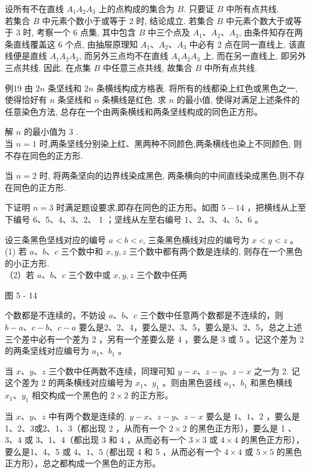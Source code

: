 \documentclass[10pt]{article}
\begin{document}
设所有不在直线 $A_{1} A_{2} A_{3}$ 上的点构成的集合为 $B$. 只要证 $B$ 中所有点共线.\\
若集合 $B$ 中元素个数小于或等于 2 时, 结论成立. 若集合 $B$ 中元素个数大于或等于 3 时, 考察一个 6 点集, 其中包含 $B$ 中三个点及 $A_{1} 、 A_{2} 、 A_{3}$, 由条件知存在两条直线覆盖这 6 个点, 由抽屉原理知 $A_{1} 、 A_{2} 、 A_{3}$ 中必有 2 点在同一直线上, 该直线便是直线 $A_{1} A_{2} A_{3}$, 而另外三点均不在直线 $A_{1} A_{2} A_{3}$ 上, 而在另一直线上, 即另外三点共线. 因此, 在点集 $B$ 中任意三点共线, 故集合 $B$ 中所有点共线.

例19 由 $2 n$ 条坚线和 $2 n$ 条横线构成方格表. 将所有的线都染上红色或黑色之一, 使得恰好有 $n$ 条坚线和 $n$ 条横线是红色. 求 $n$ 的最小值, 使得对满足上述条件的任意染色方法, 总存在一个由两条横线和两条坚线构成的同色正方形。

解 $n$ 的最小值为 3 .\\
当 $n=1$ 时,两条坚线分别染上红、黑两种不同颜色,两条横线也染上不同颜色, 则不存在同色的正方形.

当 $n=2$ 时, 将两条坚向的边界线染成黑色, 两条横向的中间直线染成黑色,则不存在同色的正方形.

下证明 $n=3$ 时满足题设要求,即存在同色的正方形。如图 $5-14$ ，把横线从上至下编号 6、5、4、3、2、 1 ；坚线从左至右编号 $1 、 2 、 3 、 4 、 5 、 6$ 。

设三条黑色坚线对应的编号 $a<b<c$, 三条黑色横线对应的编号为 $x<y<z$ 。\\
(1) 若 $a 、 b 、 c$ 三个数中和 $x, y, z$ 三个数中都有两个数是连续的, 则存在一个黑色的小正方形.\\
（2）若 $a 、 b 、 c$ 三个数中或 $x, y, z$ 三个数中任两

图 5 - 14

个数都是不连续的，不妨设 $a 、 b 、 c$ 三个数中任意两个数都是不连续的，则 $b-a 、 c-b 、 c-a$ 要么是2、2、4，要么是2、3、5，要么是3、2、5，总之上述三个差中必有一个差为 2 ，另有一个差要么是 4 ，要么是 3 或 5 。记这个差为 2的两条坚线对应编号为 $a_{1} 、 b_{1}$ 。

当 $x 、 y 、 z$ 三个数中任两数不连续，同理可知 $y-x 、 z-y 、 z-x$ 之一为 2. 记这个差为 2 的两条横线对应编号为 $x_{1} 、 y_{1}$ 。则由黑色竖线 $a_{1} 、 b_{1}$ 和黑色横线 $x_{1} 、 y_{1}$ 相交构成一个黑色的 $2 \times 2$ 的正方形。

当 $x 、 y 、 z$ 中有两个数是连续的. $y-x 、 z-y 、 z-x$ 要么是 $1 、 1 、 2$ ，要么是1、2、3或2、1、3（都出现 2 ，从而有一个 $2 \times 2$ 的黑色正方形），要么是 1 、 $3 、 4$ 或 3、1、4（都出现 3 和 4 ，从而必有一个 $3 \times 3$ 或 $4 \times 4$ 的黑色正方形），要么是1、4、5 或 $4 、 1 、 5$ (都出现 4 和 5 ，从而必有一个 $4 \times 4$ 或 $5 \times 5$ 的黑色正方形），总之都构成一个黑色的正方形。
\end{document}
